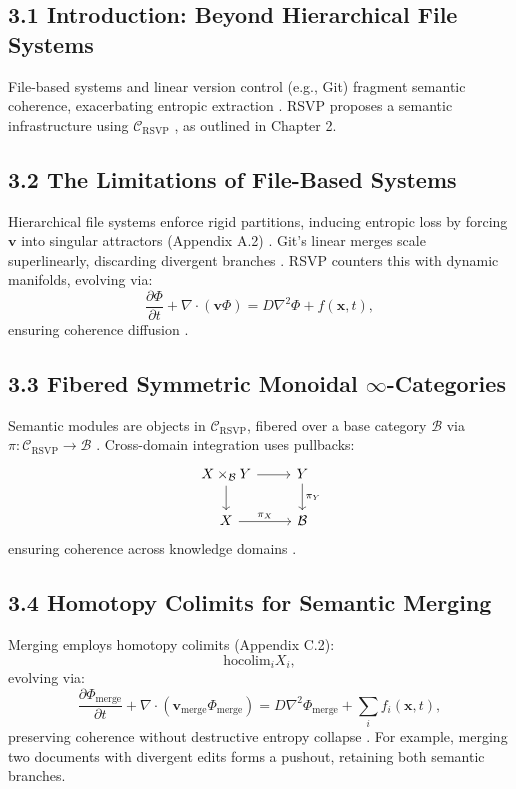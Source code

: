 \documentclass[12pt]{article}
\begin{document}
\subsection{3.1 Introduction: Beyond Hierarchical File Systems}

File-based systems and linear version control (e.g., Git) fragment semantic coherence, exacerbating entropic extraction \citep{lanier2018, bird1988}. RSVP proposes a semantic infrastructure using \(\mathcal{C}_{\text{RSVP}}\) \citep{maclane1998}, as outlined in Chapter 2.

\subsection{3.2 The Limitations of File-Based Systems}

Hierarchical file systems enforce rigid partitions, inducing entropic loss by forcing \(\mathbf{v}\) into singular attractors (Appendix A.2) \citep{cover2006}. Git’s linear merges scale superlinearly, discarding divergent branches \citep{bird1988}. RSVP counters this with dynamic manifolds, evolving via:
\[
\frac{\partial \Phi}{\partial t} + \nabla \cdot (\mathbf{v} \Phi) = D \nabla^2 \Phi + f(\mathbf{x}, t),
\]
ensuring coherence diffusion \citep{gromov1999}.

\subsection{3.3 Fibered Symmetric Monoidal \(\infty\)-Categories}

Semantic modules are objects in \(\mathcal{C}_{\text{RSVP}}\), fibered over a base category \(\mathcal{B}\) via \(\pi: \mathcal{C}_{\text{RSVP}} \to \mathcal{B}\) \citep{lawvere2009}. Cross-domain integration uses pullbacks:
\[
\begin{tikzcd}
X \times_{\mathcal{B}} Y \arrow[r] \arrow[d] & Y \arrow[d, "\pi_Y"] \\
X \arrow[r, "\pi_X"] & \mathcal{B}
\end{tikzcd}
\]
ensuring coherence across knowledge domains \citep{maclane1998}.

\subsection{3.4 Homotopy Colimits for Semantic Merging}

Merging employs homotopy colimits (Appendix C.2):
\[
\text{hocolim}_i X_i,
\]
evolving via:
\[
\frac{\partial \Phi_{\text{merge}}}{\partial t} + \nabla \cdot (\mathbf{v}_{\text{merge}} \Phi_{\text{merge}}) = D \nabla^2 \Phi_{\text{merge}} + \sum_i f_i(\mathbf{x}, t),
\]
preserving coherence without destructive entropy collapse \citep{hatcher2002}. For example, merging two documents with divergent edits forms a pushout, retaining both semantic branches.
\end{document}
